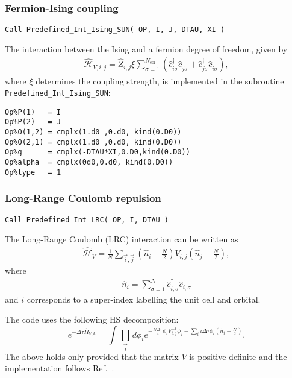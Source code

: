 \subsubsection{Fermion-Ising coupling}

\begin{lstlisting}[style=fortran]
Call Predefined_Int_Ising_SUN( OP, I, J, DTAU, XI )
\end{lstlisting}

The interaction between the Ising and a fermion degree of freedom, given by
\begin{align}
\hat{\mathcal{H}}_{V,i,j} =
\hat{Z}_{i,j} \xi  \sum_{\sigma=1}^{N_\mathrm{col}}\left( \hat{c}^{\dagger}_{i \sigma} \hat{c}^{\phantom\dagger}_{j \sigma} + \hat{c}^{\dagger}_{j \sigma} \hat{c}^{\phantom\dagger}_{i \sigma} \right),
\end{align} 
where $\xi$ determines the coupling strength, is implemented in the subroutine \texttt{Predefined\_Int\_Ising\_SUN}:
\begin{lstlisting}[style=fortran]
Op%P(1)   = I
Op%P(2)   = J
Op%O(1,2) = cmplx(1.d0 ,0.d0, kind(0.D0)) 
Op%O(2,1) = cmplx(1.d0 ,0.d0, kind(0.D0)) 
Op%g      = cmplx(-DTAU*XI,0.D0,kind(0.D0))
Op%alpha  = cmplx(0d0,0.d0, kind(0.D0)) 
Op%type   = 1

\end{lstlisting}



\subsubsection{Long-Range Coulomb repulsion}

\begin{lstlisting}[style=fortran]
Call Predefined_Int_LRC( OP, I, DTAU )
\end{lstlisting}

The Long-Range Coulomb (LRC) interaction can be written as
\begin{align}
\hat{\mathcal{H}}_{V} =
\frac{1} { N } \sum_{\vec{i},\vec{j}}  \left(  \hat{n}_{i} -  \frac{N}{2}  \right)  V_{i,j} \left(  \hat{n}_{j} -  \frac{N}{2}  \right), 
\end{align} 
where
\begin{align}
\hat{n}_{i} = \sum_{\sigma=1}^{N}  \hat{c}^{\dagger}_{i,\sigma}  \hat{c}^{}_{i,\sigma}
\end{align} 
and  $i$ corresponds to a super-index labelling  the unit cell and orbital. 


  The code uses the following  HS decomposition:
\begin{equation}
e^{-\Delta \tau \hat{H}_{V,k} }  =  \int \prod_{\vec{i}} d \phi_{i}   e^{ - \frac{N \Delta \tau} {4} \phi_{i} V^{-1}_{i,j}  \phi_{j} - \sum_{i}  i \Delta \tau \phi_i \left( \hat{n}_{i} - \frac{N}{2} \right) }.
\end{equation}
The above holds only provided that the matrix $V$ is positive definite and the implementation follows Ref.~\cite{Hohenadler14}.   

